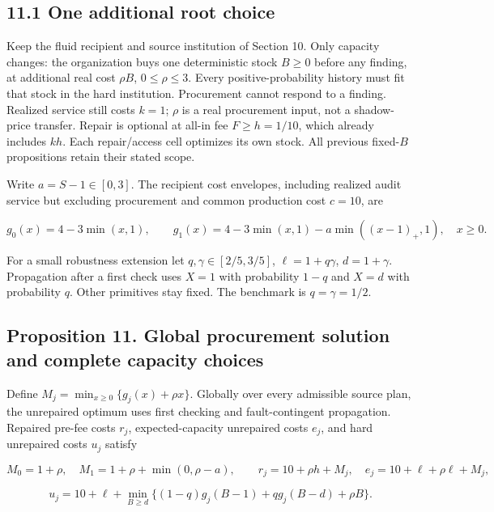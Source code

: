 \documentclass[
  11pt,
  a4paper,
]{article}
\begin{document}
\hypertarget{one-additional-root-choice}{%
\subsection{11.1 One additional root
choice}\label{one-additional-root-choice}}

Keep the fluid recipient and source institution of Section 10. Only
capacity changes: the organization buys one deterministic stock
\(B\geq0\) before any finding, at additional real cost \(\rho B\),
\(0\leq\rho\leq3\). Every positive-probability history must fit that
stock in the hard institution. Procurement cannot respond to a finding.
Realized service still costs \(k=1\); \(\rho\) is a real procurement
input, not a shadow-price transfer. Repair is optional at all-in fee
\(F\geq h=1/10\), which already includes \(kh\). Each repair/access cell
optimizes its own stock. All previous fixed-\(B\) propositions retain
their stated scope.

Write \(a=S-1\in[0,3]\). The recipient cost envelopes, including
realized audit service but excluding procurement and common production
cost \(c=10\), are

\[g_0(x)=4-3\min(x,1),\qquad
 g_1(x)=4-3\min(x,1)-a\min((x-1)_+,1),\quad x\geq0.\tag{57}\]

For a small robustness extension let \(q,\gamma\in[2/5,3/5]\),
\(\ell=1+q\gamma\), \(d=1+\gamma\). Propagation after a first check uses
\(X=1\) with probability \(1-q\) and \(X=d\) with probability \(q\).
Other primitives stay fixed. The benchmark is \(q=\gamma=1/2\).

\hypertarget{proposition-11.-global-procurement-solution-and-complete-capacity-choices}{%
\subsection{Proposition 11. Global procurement solution and complete
capacity
choices}\label{proposition-11.-global-procurement-solution-and-complete-capacity-choices}}

Define \(M_j=\min_{x\geq0}\{g_j(x)+\rho x\}\). Globally over every
admissible source plan, the unrepaired optimum uses first checking and
fault-contingent propagation. Repaired pre-fee costs \(r_j\),
expected-capacity unrepaired costs \(e_j\), and hard unrepaired costs
\(u_j\) satisfy

\[M_0=1+\rho,\quad M_1=1+\rho+\min(0,\rho-a),\qquad
r_j=10+\rho h+M_j,\quad e_j=10+\ell+\rho\ell+M_j,\tag{58}\]

\[u_j=10+\ell+\min_{B\geq d}\{(1-q)g_j(B-1)+qg_j(B-d)+\rho B\}.\tag{59}\]
\end{document}

